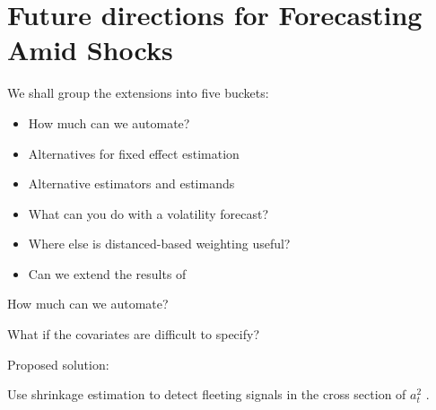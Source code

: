 \documentclass[9pt]{beamer}
\theoremstyle{definition}
\begin{document}
\section{Future directions for Forecasting Amid Shocks}



\begin{frame}
We shall group the extensions into five buckets:
\begin{itemize}
    \item How much can we automate?
    \item Alternatives for fixed effect estimation
    \item Alternative estimators and estimands
    \item What can you do with a volatility forecast?
    \item Where else is distanced-based weighting useful?
    \item Can we extend the results of \parencite[][]{bodilsen2023exploiting}
\end{itemize}
\end{frame}


\begin{frame}{How much can we automate?}

    What if the covariates are difficult to specify?

    \bigbreak
    Proposed solution:

    \bigbreak

    Use shrinkage estimation to detect fleeting signals in the cross section of $a_{t}^{2}$ \parencite[][]{chinco2019sparse}. 
\end{frame}





        
\end{document}
